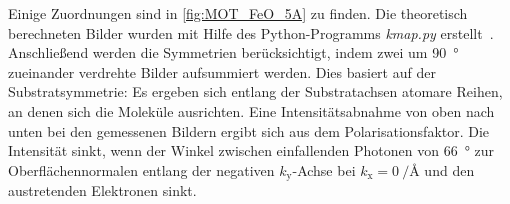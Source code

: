             Einige Zuordnungen sind in \autoref{fig:MOT_FeO_5A} zu finden.
            Die theoretisch berechneten Bilder wurden mit Hilfe des Python-Programms \textit{kmap.py} erstellt~\cite{brandstetter_kmappy_2021}.
            Anschließend werden die Symmetrien berücksichtigt, indem zwei um \SI{90}{\degree} zueinander verdrehte Bilder aufsummiert werden.
            Dies basiert auf der Substratsymmetrie: Es ergeben sich entlang der Substratachsen atomare Reihen, an denen sich die Moleküle ausrichten.
            Eine Intensitätsabnahme von oben nach unten bei den gemessenen Bildern ergibt sich aus dem Polarisationsfaktor.
            Die Intensität sinkt, wenn der Winkel zwischen einfallenden Photonen von \SI{66}{\degree} zur Oberflächennormalen entlang der negativen $k_\text{y}$-Achse bei $k_\text{x} = \SI[per-mode=reciprocal]{0}{\per\angstrom}$ und den austretenden Elektronen sinkt.

